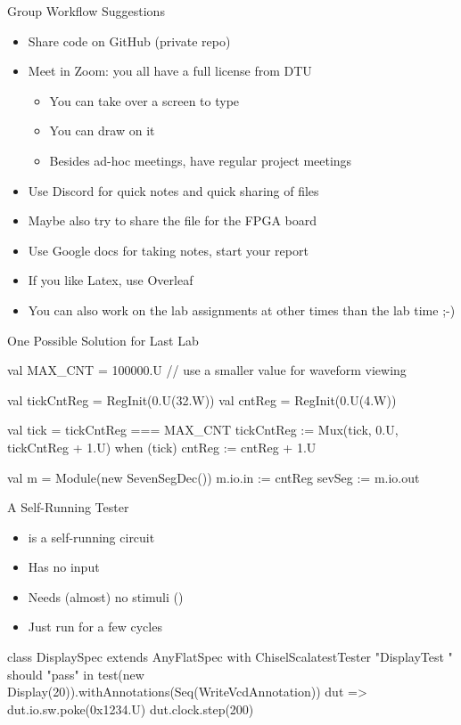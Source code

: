 \begin{frame}[fragile]{Group Workflow Suggestions}
\begin{itemize}
\item Share code on GitHub (private repo)
\item Meet in Zoom: you all have a full license from DTU
\begin{itemize}
\item You can take over a screen to type
\item You can draw on it
\item Besides ad-hoc meetings, have regular project meetings
\end{itemize}
\item Use Discord for quick notes and quick sharing of files
\item Maybe also try to share the  file for the FPGA board
\item Use Google docs for taking notes, start your report
\item If you like Latex, use Overleaf
\item You can also work on the lab assignments at other times than the lab time ;-)
\end{itemize}
\end{frame}


\begin{frame}[fragile]{One Possible Solution for Last Lab}
\begin{chisel}
  val MAX_CNT = 100000.U // use a smaller value for waveform viewing

  val tickCntReg = RegInit(0.U(32.W))
  val cntReg = RegInit(0.U(4.W))

  val tick = tickCntReg === MAX_CNT
  tickCntReg := Mux(tick, 0.U, tickCntReg + 1.U)
  when (tick) {
    cntReg := cntReg + 1.U
  }

  val m = Module(new SevenSegDec())
  m.io.in := cntReg
  sevSeg := m.io.out
\end{chisel}
\end{frame}

\begin{frame}[fragile]{A Self-Running Tester}
\begin{itemize}
\item {} is a self-running circuit
\item Has no input
\item Needs (almost) no stimuli ()
\item Just run for a few cycles
\end{itemize}
\begin{chisel}
class DisplaySpec extends AnyFlatSpec with ChiselScalatestTester {
  "DisplayTest " should "pass" in {
    test(new Display(20)).withAnnotations(Seq(WriteVcdAnnotation)) { dut =>
      dut.io.sw.poke(0x1234.U)
      dut.clock.step(200)
    }
  }
}
\end{chisel}
\end{frame}


